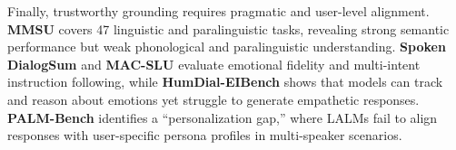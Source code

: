 \documentclass{llmxive}
\begin{document}
Finally, trustworthy grounding requires pragmatic and user-level alignment. \textbf{MMSU} \cite{wang2025mmsu} covers 47 linguistic and paralinguistic tasks, revealing strong semantic performance but weak phonological and paralinguistic understanding. \textbf{Spoken DialogSum} \cite{lu2025spoken} and \textbf{MAC-SLU} \cite{peng2025mac} evaluate emotional fidelity and multi-intent instruction following, while \textbf{HumDial-EIBench} \cite{wang2026humdialeibenchhumanrecordedmultiturnemotional} shows that models can track and reason about emotions yet struggle to generate empathetic responses. \textbf{PALM-Bench} \cite{wang2026palm} identifies a ``personalization gap,'' where LALMs fail to align responses with user-specific persona profiles in multi-speaker scenarios.




\end{document}
